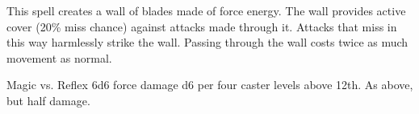 \begin{spellheader}
\end{spellheader}
\begin{spellcontent}
    \begin{spelltargetinginfo}
    \end{spelltargetinginfo}
    \begin{spelleffects}
        \spelleffect This spell creates a wall of blades made of force energy. The wall provides active cover (20\% miss chance) against attacks made through it. Attacks that miss in this way harmlessly strike the wall. Passing through the wall costs twice as much movement as normal.
        \spelldur{\durshort \dismissable}
    \end{spelleffects}
\end{spellcontent}
\begin{spellsubcontent}
    \begin{spelltargetinginfo}
    \end{spelltargetinginfo}
    \begin{spelleffects}
        \begin{spellattack}{Magic vs. Reflex}
            \spellsuccess 6d6 force damage \add d6 per four caster levels above 12th.
            \spellfailure As above, but half damage.
        \end{spellattack}
    \end{spelleffects}
\end{spellsubcontent}
\begin{spellfooter}

\end{spellfooter}

